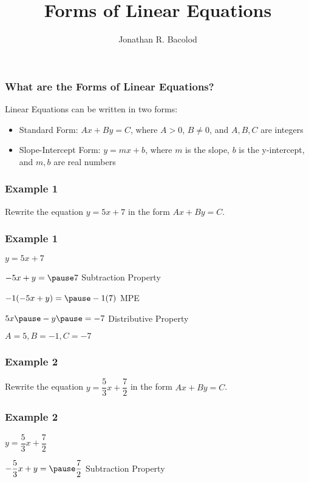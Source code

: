 \documentclass[14pt]{beamer}
\title[] {Forms of Linear Equations}
\author{Jonathan R. Bacolod}
\institute[SHS]{Sauyo High School}
\date{}
\begin{document}
	\frame{\titlepage}
	
	\begin{frame}
		\frametitle{What are the Forms of Linear Equations?}
		Linear Equations can be written in two forms: 
	
		\begin{itemize} 
			\item<2-> Standard Form: $ Ax+By=C $, where $ A > 0$, $ B \neq 0$, and $ A, B, C $ are integers 
			\item<3-> Slope-Intercept Form: $ y=mx+b $, where $ m $ is the slope, $ b $ is the y-intercept, and $ m, b $ are real numbers 
		\end{itemize} 
	\end{frame}

    \begin{frame}
    	\frametitle{Example 1}
    	Rewrite the equation $ y = 5x + 7 $ in the form $ Ax+By=C $.
    \end{frame}

    \begin{frame}
    	\frametitle{Example 1}
    	$ y = 5x + 7 $
    	
    	\pause \vone $ -5x + y = \pause 7 $ \pause \void Subtraction Property
    	
    	\pause \vone $ -1(-5x + y) = \pause -1(7) $ \pause \void MPE
    	
    	\pause \vone $ 5x \pause - y \pause = -7 $ \pause \void Distributive Property
    	
   		\pause \vone $ A = 5, B = -1, C = -7$
    \end{frame}

    \begin{frame}
    	\frametitle{Example 2}
    	Rewrite the equation $ y = \dfrac{5}{3}x + \dfrac{7}{2} $ in the form $ Ax+By=C $.
    \end{frame}

    \begin{frame}
    	\frametitle{Example 2}
    	$ y = \dfrac{5}{3}x + \dfrac{7}{2} $
    	
    	\pause \vone $ -\dfrac{5}{3}x + y = \pause \dfrac{7}{2} $ \pause \void Subtraction Property
    	
    \end{frame}
\end{document}
